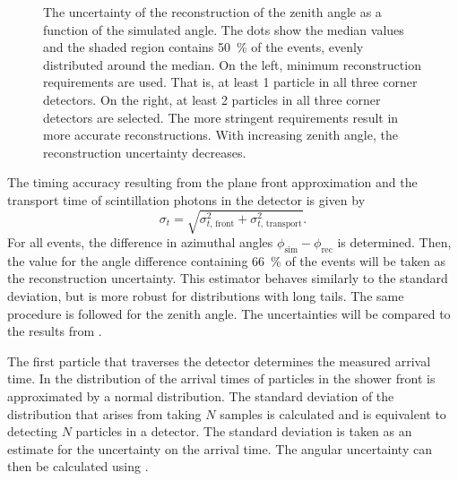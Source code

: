 \begin{figure}
\centering
{


}
\caption{The uncertainty of the reconstruction of the zenith angle as a
function of the simulated angle. The dots show the median values and the
shaded region contains \SI{50}{\percent} of the events, evenly distributed
around the median.  On the left, minimum reconstruction requirements are
used.  That is, at least 1 particle in all three corner detectors.  On the
right, at least 2 particles in all three corner detectors are selected.
The more stringent requirements result in more accurate reconstructions.
With increasing zenith angle, the reconstruction uncertainty decreases.}
\label{fig:theta-reconstruction-error}
\end{figure}

The timing accuracy resulting from the plane front approximation and the
transport time of scintillation photons in the detector is given by
\begin{equation}
\sigma_t = \sqrt{\sigma_{t,\, \mathrm{front}}^2 + \sigma_{t,\,
\mathrm{transport}}^2}.
\end{equation}
For all
events, the difference in azimuthal angles $\phi_\mathrm{sim} -
\phi_\mathrm{rec}$ is determined. Then, the value for the angle
difference containing \SI{66}{\percent} of the events will be taken as the
reconstruction uncertainty. This estimator behaves similarly to the standard
deviation, but is more robust for distributions with long tails. The same
procedure is followed for the zenith angle.
The uncertainties will be compared to the results from
.

The first particle that traverses the detector determines the measured arrival
time. In \cite{Steijger:2010-firsthit} the distribution of the arrival times of
particles in the shower front is approximated by a normal distribution.
The standard deviation of the distribution that arises from taking $N$ samples
is calculated and is equivalent to detecting $N$ particles in a detector.
The standard deviation is taken as an estimate for the uncertainty on the
arrival time.  The angular uncertainty can then be calculated using
.

